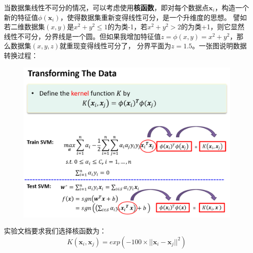 \documentclass{article}
\begin{document}
当数据集线性不可分的情况，可以考虑使用\textbf{核函数}，即对每个数据点$\textbf{x}_i$，构造一个新的特征值$\phi(\textbf{x}_i)$，使得数据集重新变得线性可分，是一个升维度的思想。
譬如若二维数据集$(x,y)$是$x^2+y^2\leq 1$的为类-1，若$x^2+y^2> 2$的为类+1，则它显然线性不可分，分界线是一个圆。但如果我增加特征值$z=\phi(x,y)=x^2+y^2$，那么数据集$(x,y,z)$就重现变得线性可分了，
分界平面为$z=1.5$。一张图说明数据转换过程：
\begin{figure}[H]
	\centering
	\includegraphics[width=\linewidth]{7.png}
\end{figure}

实验文档要求我们选择核函数为：
\begin{equation}
	K(\textbf{x}_i,\textbf{x}_j)=exp(-100\times||\textbf{x}_i-\textbf{x}_j||^2)
\end{equation}
\end{document}
